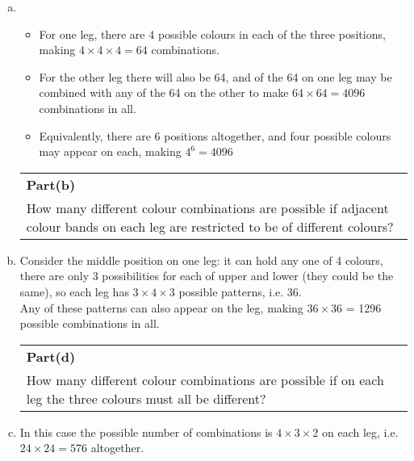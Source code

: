 \documentclass[a4paper,12pt]{article}
\begin{document}
\begin{enumerate}[(a)]
\item  
\begin{itemize}
\item For one leg, there are 4 possible colours in each of the three positions, making
$4 \times 4 \times 4 = 64$ combinations.
\item For the other leg there will also be 64, and of the 64
on one leg may be combined with any of the 64 on the other to make $64 \times 64 = 4096$
combinations in all.

\item Equivalently, there are 6 positions altogether, and four possible colours may appear
on each, making $4^6 = 4096$
\end{itemize}



\newpage
  \begin{table}[ht!]
     \centering
     \begin{tabular}{|p{15cm}|}
     \hline  
\noindent \textbf{Part(b)}\\ How many different colour combinations are possible if adjacent colour bands on each leg are restricted to be of different colours?    
 \\ \hline 
      \end{tabular}
    \end{table} 

\item Consider the middle position on one leg: it can hold any one of 4 colours, there
are only 3 possibilities for each of upper and lower (they could be the same), so each leg
has $3 \times 4 \times 3$ possible patterns, i.e. 36. 
\\ Any of these patterns can also appear on the leg,
making $36 \times 36$ = 1296 possible combinations in all.


\newpage


  \begin{table}[ht!]
     \centering
     \begin{tabular}{|p{15cm}|}
     \hline  
\noindent \textbf{Part(d)}\\ How many different colour combinations are possible if on each leg the three colours must all be different?  
 \\ \hline 
      \end{tabular}
    \end{table} 
    

\item In this case the possible number of combinations is $4\times 3 \times 2 $ on each leg, i.e. $24\times
24 = 576$ altogether.
\newpage



\end{enumerate}
\end{document}
